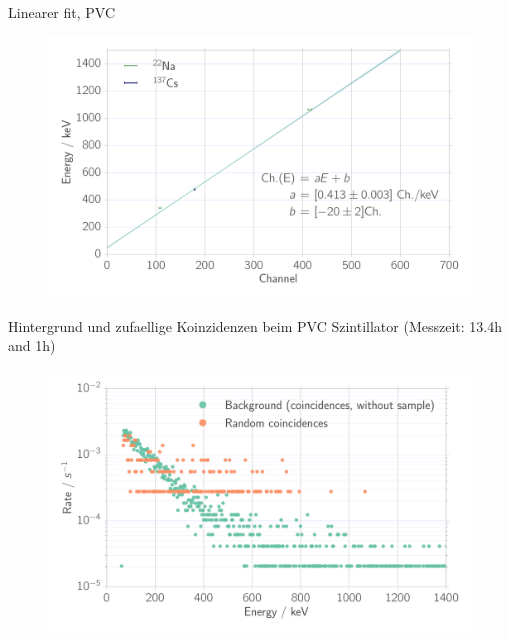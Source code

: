 \documentclass[xcolor=x11names,compress]{beamer}
\renewcommand{\(}{\begin{columns}}
\renewcommand{\)}{\end{columns}}
\newcommand{\<}[1]{\begin{column}{#1}}
\renewcommand{\>}{\end{column}}
\begin{document}
\begin{frame}[t]{Linearer fit, PVC}
\begin{figure}[htpb]
    \centering
    \includegraphics[width=1.0\linewidth]{../analysis/figures/calibration_ps_linear_fit}
\label{fig:calibration_ps_linear_fit}
\end{figure}
\end{frame}

\begin{frame}[t]{Hintergrund und zufaellige Koinzidenzen beim 
        PVC Szintillator (Messzeit: 13.4h and 1h)}
    \begin{figure}[htpb]
    \centering
    \includegraphics[width=1.0\linewidth]{../analysis/figures/coin_background_random}
    \label{fig:coin_ps_background}
\end{figure}
\end{frame}
\end{document}
